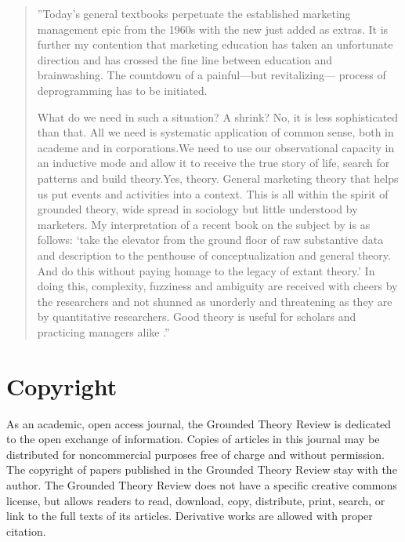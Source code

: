 \begin{quote}
''Today’s general textbooks perpetuate the established marketing
management epic from the 1960s with the new just added as extras. It
is further my contention that marketing education has taken an
unfortunate direction and has crossed the fine line between education
and brainwashing. The countdown of a painful—but revitalizing—
process of deprogramming has to be initiated.

What do we need in such a situation? A shrink? No, it is less
sophisticated than that. All we need is systematic application of
common sense, both in academe and in corporations.We need to use
our observational capacity in an inductive mode and allow it to receive
the true story of life, search for patterns and build theory.Yes, theory.
General marketing theory that helps us put events and activities into a
context. This is all within the spirit of grounded theory, wide spread in
sociology but little understood by marketers. My interpretation of a
recent book on the subject by 
\citep{book.glaser01}
is as follows: ‘take the
elevator from the ground floor of raw substantive data and description to
the penthouse of conceptualization and general theory. And do this
without paying homage to the legacy of extant theory.’ In doing this,
complexity, fuzziness and ambiguity are received with cheers by the
researchers and not shunned as unorderly and threatening as they are
by quantitative researchers. Good theory is useful for scholars and
practicing managers alike \citep[p. 132]{article.gummensson02}.''
\end{quote}

\section*{Copyright}

As an academic, open access journal,
the Grounded Theory Review is dedicated to the open exchange of information.
Copies of articles in this journal may be distributed for noncommercial purposes
free of charge and without permission.
The copyright of papers published in the Grounded Theory Review stay with the author.
The Grounded Theory Review does not have a specific creative commons license,
but allows readers to read, download, copy, distribute, print, search,
or link to the full texts of its articles.  Derivative works are allowed with proper citation.





